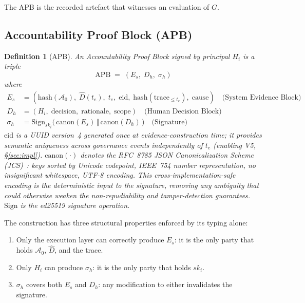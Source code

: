 \documentclass[11pt]{article}
\newtheorem{definition}{Definition}[section]
\newcommand{\Azero}{\mathcal{A}_0}
\newcommand{\Dhat}{\widehat{D}}
\newcommand{\Es}{E_s}
\newcommand{\Dh}{D_h}
\newcommand{\sigh}{\sigma_h}
\newcommand{\Hi}{H_i}
\newcommand{\ski}{sk_i}
\newcommand{\APB}{\mathrm{APB}}
\begin{document}
The APB is the recorded artefact that witnesses an evaluation of
$G$.

\subsection{Accountability Proof Block (APB)}
\label{sec:apb}

\begin{definition}[APB]
\label{def:apb}
An \emph{Accountability Proof Block} signed by principal $\Hi$ is a
triple
\[
  \APB \;=\; (\Es,\;\Dh,\;\sigh)
\]
where
\begin{align*}
  \Es &= (\mathrm{hash}(\Azero),\; \Dhat(t_e),\; t_e,\;
         \mathrm{eid},\;
         \mathrm{hash}(\mathrm{trace}_{\le t_e}),\; \mathrm{cause})
         \quad\text{(System Evidence Block)}\\
  \Dh &= (\Hi,\;\mathrm{decision},\;\mathrm{rationale},\;\mathrm{scope})
         \quad\text{(Human Decision Block)}\\
  \sigh &= \mathrm{Sign}_{\ski}\!\bigl(\,
            \mathrm{canon}(\Es) \,\Vert\, \mathrm{canon}(\Dh)
            \,\bigr)
         \quad\text{(Signature)}
\end{align*}
$\mathrm{eid}$ is a UUID version~4 generated once at evidence-construction
time; it provides semantic uniqueness across governance events independently
of $t_e$ (enabling V5, \S\ref{sec:impl}).
$\mathrm{canon}(\cdot)$ denotes the RFC~8785 JSON Canonicalization Scheme
(JCS)~\citep{rfc8785}: keys sorted by Unicode codepoint, IEEE~754
number representation, no insignificant whitespace, UTF-8 encoding.
This cross-implementation-safe encoding is the deterministic
input to the signature, removing any ambiguity that could otherwise
weaken the non-repudiability and tamper-detection guarantees.
$\mathrm{Sign}$ is the ed25519 signature operation.
\end{definition}

The construction has three structural properties enforced by its
typing alone:

\begin{enumerate}[leftmargin=2em, topsep=2pt]
  \item Only the execution layer can correctly produce $\Es$: it is the
        only party that holds $\Azero$, $\Dhat$, and the trace.
  \item Only $\Hi$ can produce $\sigh$: it is the only party that holds
        $\ski$.
  \item $\sigh$ covers both $\Es$ and $\Dh$: any modification to either
        invalidates the signature.
\end{enumerate}
\end{document}
